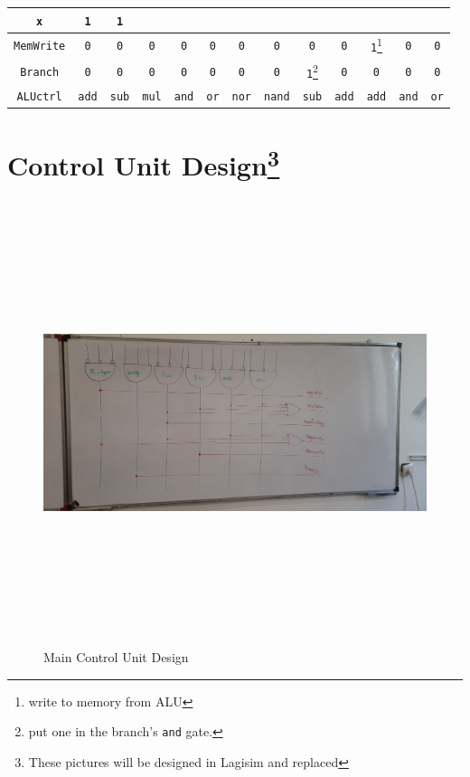 \documentclass[12pt, dvipsnames, svgnames, x11names, oneside]{book}
\begin{document}
\begin{table}
\begin{center}
\begin{tabular}{|c|c|c|c|c|c|c|c|c|c|c|c|c|}
					\texttt{x} &
					\texttt{1} &
					\texttt{1} \\ 
					\hline
					\texttt{MemWrite} &
					\texttt{0} &
					\texttt{0} &
					\texttt{0} &
					\texttt{0} &
					\texttt{0} &
					\texttt{0} &
					\texttt{0} &
					\texttt{0} &
					\texttt{0} &
					\texttt{1}\footnote{write to memory from ALU} &
					\texttt{0} &
					\texttt{0} \\ 
					\hline
					\texttt{Branch} &
					\texttt{0} &
					\texttt{0} &
					\texttt{0} &
					\texttt{0} &
					\texttt{0} &
					\texttt{0} &
					\texttt{0} &
					\texttt{1}\footnote{put one in the branch's \texttt{and} gate.} &
					\texttt{0} &
					\texttt{0} &
					\texttt{0} &
					\texttt{0} \\ 
					\hline
					\texttt{ALUctrl} &
					\texttt{add} &
					\texttt{sub} &
					\texttt{mul} &
					\texttt{and} &
					\texttt{or} &
					\texttt{nor} &
					\texttt{nand} &
					\texttt{sub} &
					\texttt{add} &
					\texttt{add} &
					\texttt{and} &
					\texttt{or} \\ 
					\hline
				\end{tabular}
			\end{center}
		\end{table}\label{sec:table:cu}
	
		\section{Control Unit Design\footnote{These pictures will be designed in Lagisim and replaced}}
			\begin{figure}[H]
				\begin{center}
					\includegraphics[width=15cm, height=13cm, angle=90]{./images/cu}
				\end{center}
			\caption{Main Control Unit Design}
			\end{figure}
			
\end{document}
